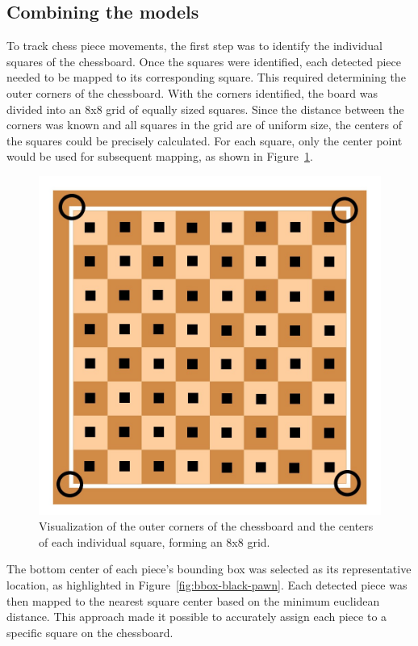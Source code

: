\newpage


\subsection{Combining the models}

To track chess piece movements, the first step was to identify the individual squares of the chessboard. Once the squares were identified, each detected piece needed to be mapped to its corresponding square. This required determining the outer corners of the chessboard. With the corners identified, the board was divided into an 8x8 grid of equally sized squares. Since the distance between the corners was known and all squares in the grid are of uniform size, the centers of the squares could be precisely calculated. For each square, only the center point would be used for subsequent mapping, as shown in Figure~\ref{fig:chessboard-centers}.



\begin{figure}[h!]
    \centering
    \includegraphics[width=0.75\linewidth]{figures/methods/ml-models/outer_corners_centers_chessboard.jpg}
    \caption[S]{Visualization of the outer corners of the chessboard and the centers of each individual square, forming an 8x8 grid. \cite{vectorstock:chessboard-svg}}
    \label{fig:chessboard-centers}
\end{figure}


The bottom center of each piece’s bounding box was selected as its representative location, as highlighted in Figure~\ref{fig:bbox-black-pawn}. Each detected piece was then mapped to the nearest square center based on the minimum euclidean distance.  This approach made it possible to accurately assign each piece to a specific square on the chessboard.



